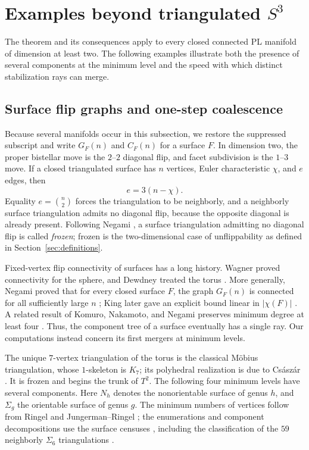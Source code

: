\documentclass[11pt]{article}
\theoremstyle{remark}
\theoremstyle{plain}
\begin{document}
\section{Examples beyond triangulated \texorpdfstring{\(S^3\)}{S3}}
\label{sec:examples}

The theorem and its consequences apply to every closed connected PL manifold
of dimension at least two.  The following examples illustrate both the
presence of several components at the minimum level and the speed with which
distinct stabilization rays can merge.

\subsection{Surface flip graphs and one-step coalescence}
\label{sec:surfaces}

Because several manifolds occur in this subsection, we restore the suppressed
subscript and write \(G_F(n)\) and \(C_F(n)\) for a surface \(F\).
In dimension two, the proper bistellar move is the \(2\)--\(2\) diagonal
flip, and facet subdivision is the \(1\)--\(3\) move.  If a closed
triangulated surface has \(n\) vertices, Euler characteristic \(\chi\), and
\(e\) edges, then
\[
 e=3(n-\chi).
\]
Equality \(e=\binom n2\) forces the triangulation to be neighborly, and a
neighborly surface triangulation admits no diagonal flip, because the
opposite diagonal is already present.  Following Negami
\cite{N99frozen}, a surface triangulation admitting no diagonal flip is
called \emph{frozen}; frozen is the two-dimensional case of unflippability
as defined in Section~\ref{sec:definitions}.

Fixed-vertex flip connectivity of surfaces has a long history.  Wagner proved
connectivity for the sphere, and Dewdney treated the torus \cite{W36,D73}.
More generally, Negami proved that for every closed surface \(F\), the graph
\(G_F(n)\) is connected for all sufficiently large \(n\)
\cite{N94,N99survey}; King later gave an explicit bound linear in
\(\lvert\chi(F)\rvert\) \cite{King03}.  A related result of Komuro,
Nakamoto, and Negami preserves minimum degree at least four \cite{KNN99}.
Thus, the component tree of a surface eventually has a single ray.  Our
computations instead concern its first mergers at minimum levels.

The unique \(7\)-vertex triangulation of the torus is the classical
M\"obius triangulation, whose \(1\)-skeleton is \(K_7\); its polyhedral
realization is due to Cs\'asz\'ar \cite{Csaszar49,K23}.  It is frozen and
begins the trunk of \(T^2\).  The following four minimum levels have several
components.  Here \(N_h\) denotes the nonorientable surface of genus \(h\),
and \(\Sigma_g\) the orientable surface of genus \(g\).  The minimum numbers of vertices follow from Ringel and
Jungerman--Ringel \cite{R55,JR80}; the enumerations and component decompositions use the surface censuses
\cite{Sul06,SulPM,SL09,LutzSurf}, including the classification of the \(59\)
neighborly \(\Sigma_6\) triangulations \cite{ABS96}.
\end{document}
